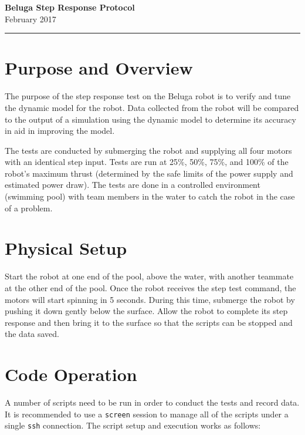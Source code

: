 \documentclass{article}
\begin{document}
\begin{center}
{\bf \Large Beluga Step Response Protocol} \\  February 2017 \\
\rule{\textwidth}{1pt}
\end{center}

\section*{Purpose and Overview}
The purpose of the step response test on the Beluga robot is to verify and tune the dynamic model for the robot.
Data collected from the robot will be compared to the output of a simulation using the dynamic model to determine its accuracy in aid in improving the model.

The tests are conducted by submerging the robot and supplying all four motors with an identical step input.
Tests are run at 25\%, 50\%, 75\%, and 100\% of the robot's maximum thrust (determined by the safe limits of the power supply and estimated power draw).
The tests are done in a controlled environment (swimming pool) with team members in the water to catch the robot in the case of a problem.

\section*{Physical Setup}
Start the robot at one end of the pool, above the water, with another teammate at the other end of the pool.
Once the robot receives the step test command, the motors will start spinning in 5 seconds.
During this time, submerge the robot by pushing it down gently below the surface.
Allow the robot to complete its step response and then bring it to the surface so that the scripts can be stopped and the data saved.

\section*{Code Operation}
A number of scripts need to be run in order to conduct the tests and record data.
It is recommended to use a \texttt{screen} session to manage all of the scripts under a single \texttt{ssh} connection.
The script setup and execution works as follows:
\end{document}
